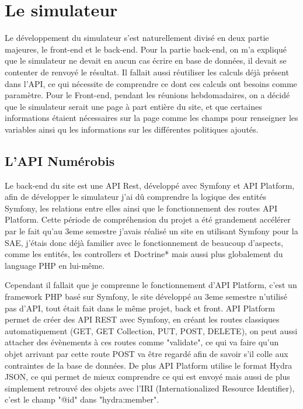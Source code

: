 \documentclass[a4paper,12pt]{report}
\begin{document}
\section{Le simulateur}
Le développement du simulateur s'est naturellement divisé en deux partie majeures, le front-end et le back-end. Pour la partie back-end, on m'a expliqué que le simulateur ne devait en aucun cas écrire en base de données, il devait se contenter de renvoyé le résultat. Il fallait aussi réutiliser les calculs déjà présent dans l'API, ce qui nécessite de comprendre ce dont ces calculs ont besoins comme paramètre. Pour le Front-end, pendant les réunions hebdomadaires, on a décidé que le simulateur serait une page à part entière du site, et que certaines informations étaient nécessaires sur la page comme les champs pour renseigner les variables ainsi qu les informations sur les différentes politiques ajoutés.

\subsection{L'API Numérobis}
Le back-end du site est une API Rest, développé avec Symfony et API Platform, afin de développer le simulateur j'ai dû comprendre la logique des entités Symfony, les relations entre elles ainsi que le fonctionnement des routes API Platform. Cette période de compréhension du projet a été grandement accélérer par le fait qu'au 3eme semestre j'avais réalisé un site en utilisant Symfony pour la SAE, j'étais donc déjà familier avec le fonctionnement de beaucoup d'aspects, comme les entités, les controllers et Doctrine* mais aussi plus globalement du language PHP en lui-même.

Cependant il fallait que je comprenne le fonctionnement d'API Platform, c'est un framework PHP basé sur Symfony, le site développé au 3eme semestre n'utilisé pas d'API, tout était fait dans le même projet, back et front. API Platform permet de créer des API REST avec Symfony, en créant les routes classiques automatiquement (GET, GET Collection, PUT, POST, DELETE), on peut aussi attacher des évènements à ces routes comme "validate", ce qui va faire qu'un objet arrivant par cette route POST va être regardé afin de savoir s'il colle aux contraintes de la base de données. De plus API Platform utilise le format Hydra JSON, ce qui permet de mieux comprendre ce qui est envoyé mais aussi de plus simplement retrouvé des objets avec l'IRI (Internationalized Resource Identifier), c'est le champ "@id" dans "hydra:member".
\end{document}
